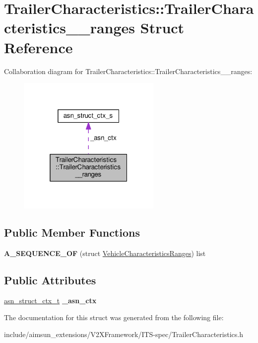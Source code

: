 \hypertarget{structTrailerCharacteristics_1_1TrailerCharacteristics____ranges}{}\section{Trailer\+Characteristics\+:\+:Trailer\+Characteristics\+\_\+\+\_\+ranges Struct Reference}
\label{structTrailerCharacteristics_1_1TrailerCharacteristics____ranges}


Collaboration diagram for Trailer\+Characteristics\+:\+:Trailer\+Characteristics\+\_\+\+\_\+ranges\+:\nopagebreak
\begin{figure}[H]
\begin{center}
\leavevmode
\includegraphics[width=196pt]{structTrailerCharacteristics_1_1TrailerCharacteristics____ranges__coll__graph}
\end{center}
\end{figure}
\subsection*{Public Member Functions}
\begin{DoxyCompactItemize}
\item 
{\bfseries A\+\_\+\+S\+E\+Q\+U\+E\+N\+C\+E\+\_\+\+OF} (struct \hyperlink{structVehicleCharacteristicsRanges}{Vehicle\+Characteristics\+Ranges}) list\hypertarget{structTrailerCharacteristics_1_1TrailerCharacteristics____ranges_a5b512263dac63240c23b3c1ef875aca9}{}\label{structTrailerCharacteristics_1_1TrailerCharacteristics____ranges_a5b512263dac63240c23b3c1ef875aca9}

\end{DoxyCompactItemize}
\subsection*{Public Attributes}
\begin{DoxyCompactItemize}
\item 
\hyperlink{structasn__struct__ctx__s}{asn\+\_\+struct\+\_\+ctx\+\_\+t} {\bfseries \+\_\+asn\+\_\+ctx}\hypertarget{structTrailerCharacteristics_1_1TrailerCharacteristics____ranges_a6adfc0aad22145f95879dd03aa93881f}{}\label{structTrailerCharacteristics_1_1TrailerCharacteristics____ranges_a6adfc0aad22145f95879dd03aa93881f}

\end{DoxyCompactItemize}


The documentation for this struct was generated from the following file\+:\begin{DoxyCompactItemize}
\item 
include/aimsun\+\_\+extensions/\+V2\+X\+Framework/\+I\+T\+S-\/spec/Trailer\+Characteristics.\+h\end{DoxyCompactItemize}
